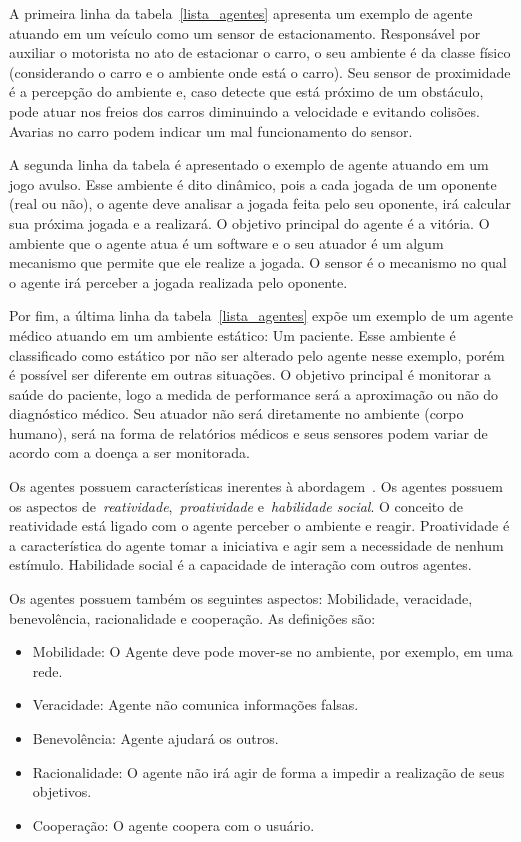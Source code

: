 A primeira linha da tabela~\ref{lista_agentes} apresenta um exemplo de agente atuando em um veículo como um sensor de estacionamento. Responsável por auxiliar o motorista no ato de estacionar o carro, o seu ambiente é da classe físico (considerando o carro e o ambiente onde está o carro). Seu sensor de proximidade é a percepção do ambiente e, caso detecte que está próximo de um obstáculo, pode atuar nos freios dos carros diminuindo a velocidade e evitando colisões. Avarias no carro podem indicar um mal funcionamento do sensor.

A segunda linha da tabela é apresentado o exemplo de agente atuando em um jogo avulso. Esse ambiente é dito dinâmico, pois a cada jogada de um oponente (real ou não), o agente deve analisar a jogada feita pelo seu oponente, irá calcular sua próxima jogada e a realizará. O objetivo principal do agente é a vitória. O ambiente que o agente atua é um software e o seu atuador é um algum mecanismo que permite que ele realize a jogada. O sensor é o mecanismo no qual o agente irá perceber a jogada realizada pelo oponente.

Por fim, a última linha da tabela~\ref{lista_agentes} expõe um exemplo de um agente médico atuando em um ambiente estático: Um paciente. Esse ambiente é classificado como estático por não ser alterado pelo agente nesse exemplo, porém é possível ser diferente em outras situações. O objetivo principal é monitorar a saúde do paciente, logo a medida de performance será a aproximação ou não do diagnóstico médico. Seu atuador não será diretamente no ambiente (corpo humano), será na forma de relatórios médicos e seus sensores podem variar de acordo com a doença a ser monitorada.

Os agentes possuem características inerentes à abordagem~\cite{wooldridge04}. Os agentes possuem os aspectos de~\emph{reatividade},~\emph{proatividade} e~\emph{habilidade social}. O conceito de reatividade  está ligado com o agente perceber o ambiente e reagir. Proatividade é a característica do agente tomar a iniciativa e agir sem a necessidade de nenhum estímulo. Habilidade social é a capacidade de interação com outros agentes.

Os agentes possuem também os seguintes aspectos: Mobilidade, veracidade, benevolência, racionalidade e cooperação. As definições são:
\begin{itemize}
	\item Mobilidade: O Agente deve pode mover-se no ambiente, por exemplo, em uma rede.
	\item Veracidade: Agente não comunica informações falsas.
	\item Benevolência: Agente ajudará os outros.
	\item Racionalidade: O agente não irá agir de forma a impedir a realização de seus objetivos.
	\item Cooperação: O agente coopera com o usuário.
\end{itemize}

